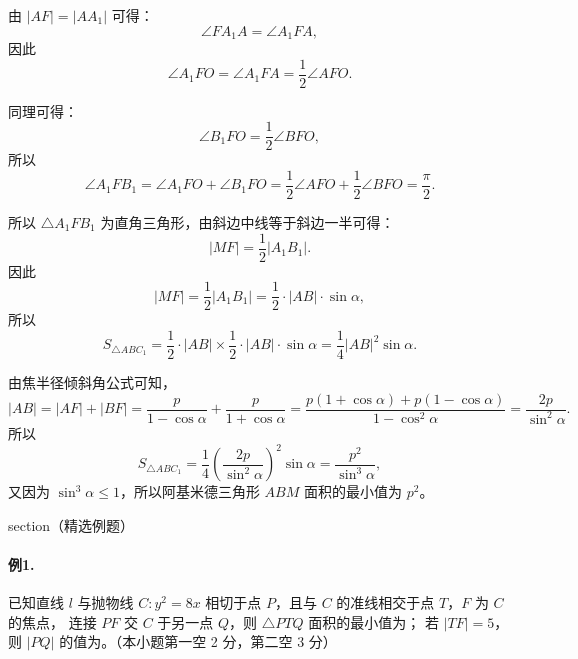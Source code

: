\documentclass[UTF8]{ctexart}
\begin{document}
	由 $|AF|=|AA_1|$ 可得：
	\[
	\angle FA_1A=\angle A_1FA,
	\]
	因此
	\[
	\angle A_1FO=\angle A_1FA=\frac12\angle AFO.
	\]
	
	同理可得：
	\[
	\angle B_1FO=\frac12\angle BFO,
	\]
	所以
	\[
	\angle A_1FB_1=\angle A_1FO+\angle B_1FO
	=\frac12\angle AFO+\frac12\angle BFO=\frac{\pi}{2}.
	\]
	
	所以 $\triangle A_1FB_1$ 为直角三角形，由斜边中线等于斜边一半可得：
	\[
	|MF|=\frac12|A_1B_1|.
	\]
	因此
	\[
	|MF|=\frac12|A_1B_1|=\frac12\cdot|AB|\cdot\sin\alpha,
	\]
	所以
	\[
	S_{\triangle ABC_1}
	=\frac12\cdot|AB|\times \frac12\cdot|AB|\cdot\sin\alpha
	=\frac14|AB|^2\sin\alpha.
	\]
	
	由焦半径倾斜角公式可知，
	\[
	|AB|=|AF|+|BF|
	=\frac{p}{1-\cos\alpha}+\frac{p}{1+\cos\alpha}
	=\frac{p(1+\cos\alpha)+p(1-\cos\alpha)}{1-\cos^2\alpha}
	=\frac{2p}{\sin^2\alpha}.
	\]
	所以
	\[
	S_{\triangle ABC_1}
	=\frac14\left(\frac{2p}{\sin^2\alpha}\right)^2\sin\alpha
	=\frac{p^2}{\sin^3\alpha},
	\]
	又因为 $\sin^3\alpha\le 1$，所以阿基米德三角形 $ABM$ 面积的最小值为 $p^2$。
	
	\*section{（精选例题）}
	
	\paragraph{例1.}
	已知直线 $l$ 与抛物线 $C: y^2=8x$ 相切于点 $P$，且与 $C$ 的准线相交于点 $T$，$F$ 为 $C$ 的焦点，
	连接 $PF$ 交 $C$ 于另一点 $Q$，则 $\triangle PTQ$ 面积的最小值为\underline{\qquad}；
	若 $|TF|=5$，则 $|PQ|$ 的值为\underline{\qquad}。（本小题第一空 2 分，第二空 3 分）
	
\end{document}
